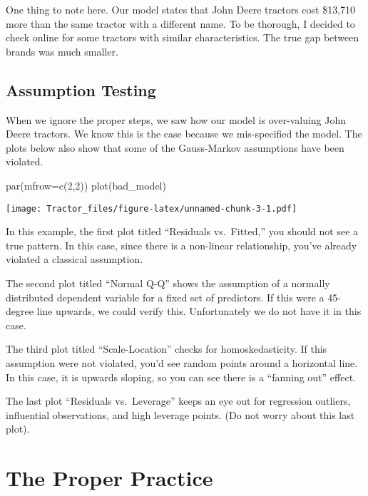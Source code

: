 \documentclass[
]{article}
\newenvironment{Shaded}{\begin{snugshade}}{\end{snugshade}}
\newcommand{\AttributeTok}[1]{\textcolor[rgb]{0.77,0.63,0.00}{#1}}
\newcommand{\DecValTok}[1]{\textcolor[rgb]{0.00,0.00,0.81}{#1}}
\newcommand{\FunctionTok}[1]{\textcolor[rgb]{0.00,0.00,0.00}{#1}}
\newcommand{\NormalTok}[1]{#1}
\begin{document}
One thing to note here. Our model states that John Deere tractors cost
\$13,710 more than the same tractor with a different name. To be
thorough, I decided to check online for some tractors with similar
characteristics. The true gap between brands was much smaller.

\hypertarget{assumption-testing}{%
\subsection{Assumption Testing}\label{assumption-testing}}

When we ignore the proper steps, we saw how our model is over-valuing
John Deere tractors. We know this is the case because we mis-specified
the model. The plots below also show that some of the Gauss-Markov
assumptions have been violated.

\begin{Shaded}
\begin{Highlighting}[]
\FunctionTok{par}\NormalTok{(}\AttributeTok{mfrow=}\FunctionTok{c}\NormalTok{(}\DecValTok{2}\NormalTok{,}\DecValTok{2}\NormalTok{))}
\FunctionTok{plot}\NormalTok{(bad\_model)}
\end{Highlighting}
\end{Shaded}

\texttt{[image: Tractor\_files/figure-latex/unnamed-chunk-3-1.pdf]}

In this example, the first plot titled ``Residuals vs.~Fitted,'' you
should not see a true pattern. In this case, since there is a non-linear
relationship, you've already violated a classical assumption.

The second plot titled ``Normal Q-Q'' shows the assumption of a normally
distributed dependent variable for a fixed set of predictors. If this
were a 45-degree line upwards, we could verify this. Unfortunately we do
not have it in this case.

The third plot titled ``Scale-Location'' checks for homoskedasticity. If
this assumption were not violated, you'd see random points around a
horizontal line. In this case, it is upwards sloping, so you can see
there is a ``fanning out'' effect.

The last plot ``Residuals vs.~Leverage'' keeps an eye out for regression
outliers, influential observations, and high leverage points. (Do not
worry about this last plot).

\hypertarget{the-proper-practice}{%
\section{The Proper Practice}\label{the-proper-practice}}
\end{document}
